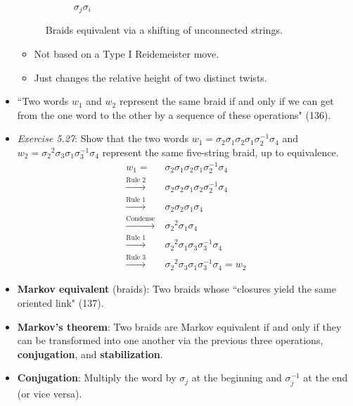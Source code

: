 \documentclass[titlepage]{article}
\numberwithin{figure}{section}
\numberwithin{table}{section}
\numberwithin{equation}{section}
\newcommand{\dq}[2]{``#1" (#2).}
\begin{document}
\begin{itemize}
\begin{figure}[h!]
\begin{subfigure}[b]{0.25\linewidth}
            \caption{$\sigma_j\sigma_i$}
            \label{fig:braid121b}
        \end{subfigure}
        \caption{Braids equivalent via a shifting of unconnected strings.}
        \label{fig:braid121}
    \end{figure}
    \begin{itemize}
        \item Not based on a Type I Reidemeister move.
        \item Just changes the relative height of two distinct twists.
    \end{itemize}
    \item \dq{Two words $w_1$ and $w_2$ represent the same braid if and only if we can get from the one word to the other by a sequence of these operations}{136}
    \item \emph{Exercise 5.27}: Show that the two words $w_1=\sigma_2\sigma_1\sigma_2\sigma_1\sigma_2^{-1}\sigma_4$ and $w_2={\sigma_2}^2\sigma_3\sigma_1\sigma_3^{-1}\sigma_4$ represent the same five-string braid, up to equivalence.
    \begin{align*}
        w_1 =&\ \sigma_2\sigma_1\sigma_2\sigma_1\sigma_2^{-1}\sigma_4\\
        \xrightarrow{\text{Rule 2}} &\ \sigma_2\sigma_2\sigma_1\sigma_2\sigma_2^{-1}\sigma_4\\
        \xrightarrow{\text{Rule 1}} &\ \sigma_2\sigma_2\sigma_1\sigma_4\\
        \xrightarrow{\text{Condense}} &\ {\sigma_2}^2\sigma_1\sigma_4\\
        \xrightarrow{\text{Rule 1}} &\ {\sigma_2}^2\sigma_1\sigma_3\sigma_3^{-1}\sigma_4\\
        \xrightarrow{\text{Rule 3}} &\ {\sigma_2}^2\sigma_3\sigma_1\sigma_3^{-1}\sigma_4=w_2
    \end{align*}
    \item \textbf{Markov equivalent} (braids): Two braids whose \dq{closures yield the same oriented link}{137}
    \item \textbf{Markov's theorem}: Two braids are Markov equivalent if and only if they can be transformed into one another via the previous three operations, \textbf{conjugation}, and \textbf{stabilization}.
    \item \textbf{Conjugation}: Multiply the word by $\sigma_j$ at the beginning and $\sigma_j^{-1}$ at the end (or vice versa).

\end{itemize}
\end{document}
